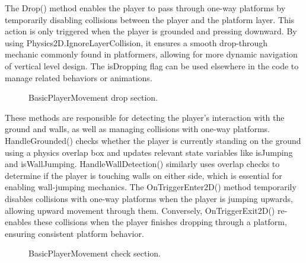 \documentclass[12pt,oneside,openright,a4paper]{cpe-english-project}
\begin{document}
\newpage
The Drop() method enables the player to pass through one-way platforms by temporarily disabling collisions between the player and the platform layer. This action is only triggered when the player is grounded and pressing downward. By using Physics2D.IgnoreLayerCollision, it ensures a smooth drop-through mechanic commonly found in platformers, allowing for more dynamic navigation of vertical level design. The isDropping flag can be used elsewhere in the code to manage related behaviors or animations.\par
 \begin{figure}[!h]
 \centering
\caption{BasicPlayerMovement drop section.}\label{fig:drop}
\end{figure}
These methods are responsible for detecting the player's interaction with the ground and walls, as well as managing collisions with one-way platforms. HandleGrounded() checks whether the player is currently standing on the ground using a physics overlap box and updates relevant state variables like isJumping and isWallJumping. HandleWallDetection() similarly uses overlap checks to determine if the player is touching walls on either side, which is essential for enabling wall-jumping mechanics. The OnTriggerEnter2D() method temporarily disables collisions with one-way platforms when the player is jumping upwards, allowing upward movement through them. Conversely, OnTriggerExit2D() re-enables these collisions when the player finishes dropping through a platform, ensuring consistent platform behavior.\par
 \begin{figure}[!h]
 \centering
\caption{BasicPlayerMovement check section.}\label{fig:check}
\end{figure}
\end{document}
